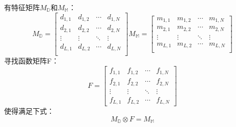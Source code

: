 \documentclass[10pt]{beamer}
\begin{document}
\begin{frame}
    有特征矩阵$M_{\mathbb{D}}$和$M_{\mathbb{M}}$：
    \begin{equation}
        M_{\mathbb{D}} = \begin{bmatrix}
            d_{1,1} & d_{1,2} & \cdots & d_{1,N} \\
            d_{2,1} & d_{2,2} & \cdots & d_{2,N} \\
            \vdots & \vdots & \ddots & \vdots \\
            d_{L,1} & d_{L,2} & \cdots & d_{L,N}\\
        \end{bmatrix}
        M_{\mathbb{M}} = \begin{bmatrix}
            m_{1,1} & m_{1,2} & \cdots & m_{1,N} \\
            m_{2,1} & m_{2,2} & \cdots & m_{2,N} \\
            \vdots & \vdots & \ddots & \vdots \\
            m_{L,1} & m_{L,2} & \cdots & m_{L,N}\\
        \end{bmatrix}
    \end{equation}
    寻找函数矩阵F：
    \begin{equation}
        F = \begin{bmatrix}
            f_{1,1} & f_{1,2} & \cdots & f_{1,N}\\
            f_{2,1} & f_{2,2} & \cdots & f_{2,N}\\
            \vdots & \vdots & \ddots & \vdots \\
            f_{L,1} & f_{L,2} & \cdots & f_{L,N}
        \end{bmatrix}
    \end{equation}
    使得满足下式：
    \begin{equation}
        M_{\mathbb{D}} \otimes F = M_{\mathbb{M}} 
    \end{equation}
\end{frame}
\end{document}
